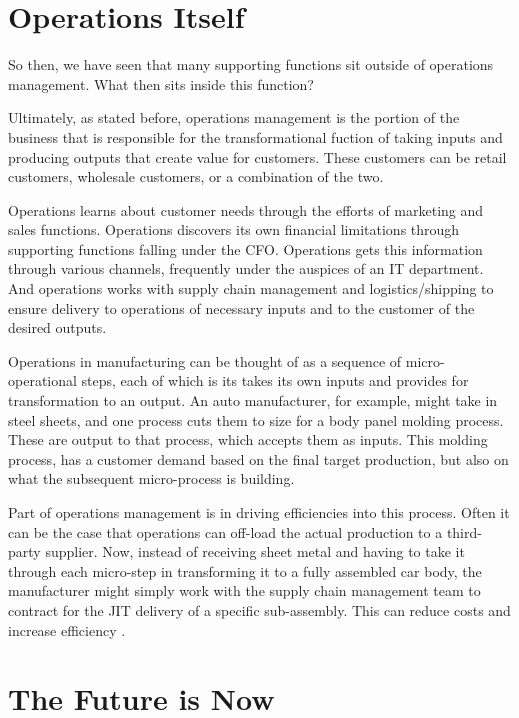 \section{Operations Itself}

So then, we have seen that many supporting functions sit outside of operations management. What then sits inside this function?

Ultimately, as stated before, operations management is the portion of the business that is responsible for the transformational fuction of taking inputs and producing outputs that create value for customers. These customers can be retail customers, wholesale customers, or a combination of the two.

Operations learns about customer needs through the efforts of marketing and sales functions. Operations discovers its own financial limitations through supporting functions falling under the CFO. Operations gets this information through various channels, frequently under the auspices of an IT department. And operations works with supply chain management and logistics/shipping to ensure delivery to operations of necessary inputs and to the customer of the desired outputs.

Operations in manufacturing can be thought of as a sequence of micro-operational steps, each of which is its takes its own inputs and provides for transformation to an output. An auto manufacturer, for example, might take in steel sheets, and one process cuts them to size for a body panel molding process. These are output to that process, which accepts them as inputs. This molding process, has a customer demand based on the final target production, but also on what the subsequent micro-process is building.

Part of operations management is in driving efficiencies into this process. Often it can be the case that operations can off-load the actual production to a third-party supplier. Now, instead of receiving sheet metal and having to take it through each micro-step in transforming it to a fully  assembled car body, the manufacturer might simply work with the supply chain management team to contract for the JIT delivery of a specific sub-assembly. This can reduce costs and increase efficiency \parencite{tsayReviewProductionOperations2018}.

\section{The Future is Now}

